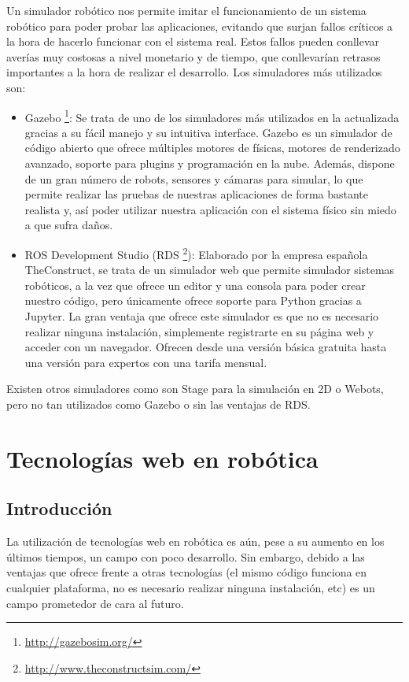 Un simulador robótico nos permite imitar el funcionamiento de un sistema robótico para poder probar las aplicaciones, evitando que surjan fallos críticos a la hora de hacerlo funcionar con el sistema real. Estos fallos pueden conllevar averías muy costosas a nivel monetario y de tiempo, que conllevarían retrasos importantes a la hora de realizar el desarrollo. Los simuladores más utilizados son:
\begin{itemize}
	\item Gazebo \footnote{\url{http://gazebosim.org/}}: Se trata de uno de los simuladores más utilizados en la actualizada gracias a su fácil manejo y su intuitiva interface. Gazebo es un simulador de código abierto que ofrece múltiples motores de físicas, motores de renderizado avanzado, soporte para plugins y programación en la nube. Además, dispone de un gran número de robots, sensores y cámaras para simular, lo que permite realizar las pruebas de nuestras aplicaciones de forma bastante realista y, así poder utilizar nuestra aplicación con el sistema físico sin miedo a que sufra daños.
	\item ROS Development Studio (RDS \footnote{\url{http://www.theconstructsim.com/}}): Elaborado por la empresa española TheConstruct, se trata de un simulador web que permite simulador sistemas robóticos, a la vez que ofrece un editor y una consola para poder crear nuestro código, pero únicamente ofrece soporte para Python gracias a Jupyter. La gran ventaja que ofrece este simulador es que no es necesario realizar ninguna instalación, simplemente registrarte en su página web y acceder con un navegador. Ofrecen desde una versión básica gratuita hasta una versión para expertos con una tarifa mensual.
\end{itemize}
Existen otros simuladores como son Stage para la simulación en 2D o  Webots, pero no tan utilizados como Gazebo o sin las ventajas de RDS.

\section{Tecnologías web en robótica}

\subsection{Introducción}

La utilización de tecnologías web en robótica es aún, pese a su aumento en los últimos tiempos, un campo con poco desarrollo. Sin embargo, debido a las ventajas que ofrece frente a otras tecnologías (el mismo código funciona en cualquier plataforma, no es necesario realizar ninguna instalación, etc) es un campo prometedor de cara al futuro.

